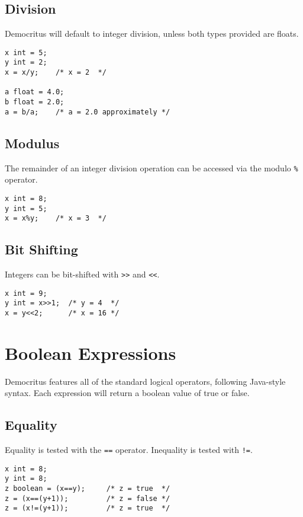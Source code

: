 		\subsection{Division}
			Democritus will default to integer division, unless both types provided are floats. 
			\begin{lstlisting}
x int = 5;
y int = 2;
x = x/y; 	/* x = 2  */

a float = 4.0;
b float = 2.0;
a = b/a; 	/* a = 2.0 approximately */
			\end{lstlisting}

        \subsection{Modulus}
            The remainder of an integer division operation can be accessed via the modulo \texttt{\%} operator. 
            \begin{lstlisting}
x int = 8;
y int = 5;
x = x%y; 	/* x = 3  */
			\end{lstlisting}
	
		\subsection{Bit Shifting}
			Integers can be bit-shifted with \texttt{\textgreater\textgreater} and \texttt{\textless\textless}.
			\begin{lstlisting}
x int = 9;
y int = x>>1;  /* y = 4  */
x = y<<2; 	   /* x = 16 */
			\end{lstlisting}
		
	\section{Boolean Expressions}
		Democritus features all of the standard logical operators, following Java-style syntax. Each expression will return a boolean value of true or false.

        \subsection{Equality}
            Equality is tested with the \texttt{==} operator. Inequality is tested with \texttt{!=}. 
            \begin{lstlisting}
x int = 8;
y int = 8;
z boolean = (x==y);  	/* z = true  */
z = (x==(y+1));         /* z = false */
z = (x!=(y+1));         /* z = true  */
			\end{lstlisting}
			

